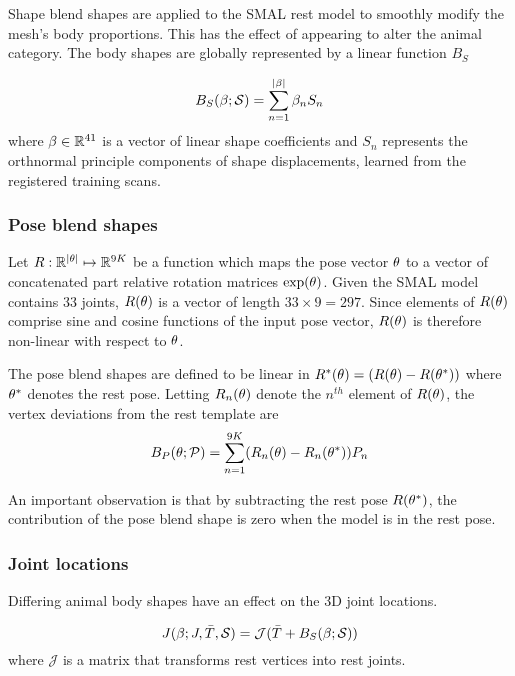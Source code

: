 Shape blend shapes are applied to the SMAL rest model to smoothly modify the mesh's body proportions. This has the effect of appearing to alter the animal category. The body shapes are globally represented by a linear function $B_{S}$

\begin{equation}\label{eqt:shapeblendshapes}
    B_{S}(\beta;\mathcal{S}) = \sum_{n=1}^{|\beta|}\beta_{n}S_{n}
\end{equation}
where $\beta \in {\mathbb{R}^{41}}$ is a vector of linear shape coefficients and $S_{n}$ represents the orthnormal principle components of shape displacements, learned from the registered training scans. 


\subsubsection{Pose blend shapes}

Let $R: {\mathbb{R}^{|\theta|}} \mapsto {\mathbb{R}^{9K}}$ be a function which maps the pose vector $\theta$ to a vector of concatenated part relative rotation matrices $\exp(\theta)$. Given the SMAL model contains $33$ joints, $R(\theta)$ is a vector of length $33 \times 9 = 297$. Since elements of $R(\theta)$ comprise sine and cosine functions of the input pose vector, $R(\theta)$ is therefore non-linear with respect to $\theta$.

The pose blend shapes are defined to be linear in $R^{*}(\theta) = (R(\theta) - R(\theta^{*}))$ where $\theta^{*}$ denotes the rest pose. Letting $R_{n}(\theta)$ denote the $n^{th}$ element of $R(\theta)$, the vertex deviations from the rest template are
\begin{equation}
    B_{P}(\theta;\mathcal{P}) = \sum_{n=1}^{9K} (R_{n}(\theta) - R_{n}(\theta^{*}))P_{n}
\end{equation}

An important observation is that by subtracting the rest pose $R(\theta^{*})$, the contribution of the pose blend shape is zero when the model is in the rest pose.

\subsubsection{Joint locations}

Differing animal body shapes have an effect on the 3D joint locations. 

\begin{equation}
    J(\beta; J, \bar{T}, \mathcal{S}) = \mathcal{J}(\bar{T} + B_{S}(\beta; \mathcal{S}))
\end{equation}
where $\mathcal{J}$ is a matrix that transforms rest vertices into rest joints.

